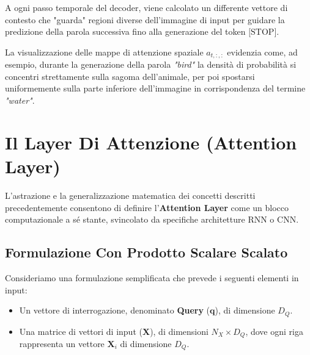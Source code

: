﻿\documentclass[11pt, a4paper]{article}
\begin{document}

A ogni passo temporale del decoder, viene calcolato un differente vettore di contesto che "guarda" regioni diverse dell'immagine di input per guidare la predizione della parola successiva fino alla generazione del token $\text{[STOP]}$.


La visualizzazione delle mappe di attenzione spaziale $a_{t,:,:}$ evidenzia come, ad esempio, durante la generazione della parola \emph{"bird"} la densità di probabilità si concentri strettamente sulla sagoma dell'animale, per poi spostarsi uniformemente sulla parte inferiore dell'immagine in corrispondenza del termine \emph{"water"}.

\newpage

\section{Il Layer Di Attenzione (Attention Layer)}

L'astrazione e la generalizzazione matematica dei concetti descritti precedentemente consentono di definire l'\textbf{Attention Layer} come un blocco computazionale a sé stante, svincolato da specifiche architetture RNN o CNN.


\subsection{Formulazione Con Prodotto Scalare Scalato}

Consideriamo una formulazione semplificata che prevede i seguenti elementi in input:
\begin{itemize}
    \item Un vettore di interrogazione, denominato \textbf{Query} ($\bm{q}$), di dimensione $D_Q$.
    \item Una matrice di vettori di input ($\bm{X}$), di dimensioni $N_X \times D_Q$, dove ogni riga rappresenta un vettore $\bm{X}_i$ di dimensione $D_Q$.
\end{itemize}
\end{document}
